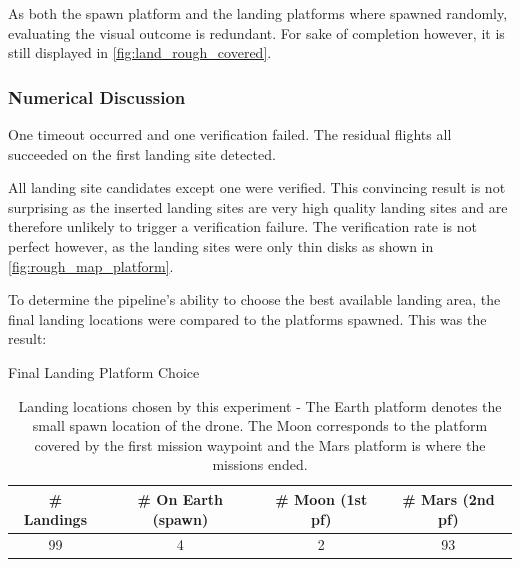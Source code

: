         As both the spawn platform and the landing platforms where spawned randomly, evaluating the visual outcome is redundant. For sake of completion however, it is still displayed in \cref{fig:land_rough_covered}.

        \subsubsection{Numerical Discussion}
        One timeout occurred and one verification failed. The residual flights all succeeded on the first landing site detected.

        
        All landing site candidates except one were verified. This convincing result is not surprising as the inserted landing sites are very high quality landing sites and are therefore unlikely to trigger a verification failure. The verification rate is not perfect however, as the landing sites were only thin disks as shown in \cref{fig:rough_map_platform}. 

        To determine the pipeline's ability to choose the best available landing area, the final landing locations were compared to the platforms spawned. This was the result:

        \begin{table}[h]
            \begin{center}
             \caption{Final Landing Platform Choice}\vspace{1ex}
             \label{tab:final_landing_platform}
             \begin{tabular}{|c|c|c|c|}
             \hline
             \# Landings & \# On Earth (spawn) & \# Moon (1st pf)  & \# Mars (2nd pf)\\ \hline \hline
             99 & 4 & 2 & 93 \\
             \hline
            \end{tabular}
        \end{center}
        \caption{Landing locations chosen by this experiment - The Earth platform denotes the small spawn location of the drone. The Moon corresponds to the platform covered by the first mission waypoint and the Mars platform is where the missions ended.}
        \end{table}

